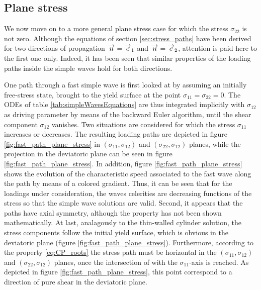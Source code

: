 \subsection{Plane stress}
We now move on to a more general plane stress case for which the stress $\sigma_{22} $ is not zero.
Although the equations of section \ref{sec:stress_paths} have been derived for two directions of propagation ${\overrightarrow{n}}={\overrightarrow{e}}_1$ and ${\overrightarrow{n}}={\overrightarrow{e}}_2 $, attention is paid here to the first one only.
Indeed, it has been seen that similar properties of the loading paths inside the simple waves hold for both directions.

One path through a fast simple wave is first looked at by assuming an initially free-stress state, brought to the yield surface at the point $ \sigma_{11}=\sigma_{22}=0 $.
The ODEs of table \ref{tab:simpleWavesEquations} are thus integrated implicitly with $\sigma_{12}$ as driving parameter by means of the backward Euler algorithm, until the shear component $\sigma_{12}$ vanishes.
Two situations are considered for which the stress $\sigma_{11}$ increases or decreases.
The resulting loading paths are depicted in figure \ref{fig:fast_path_plane_stress} in $(\sigma_{11},\sigma_{12})$ and $(\sigma_{22},\sigma_{12})$ planes, while the projection in the deviatoric plane can be seen in figure \ref{fig:fast_path_plane_stress}.
In addition, figure \ref{fig:fast_path_plane_stress} shows the evolution of the characteristic speed associated to the fast wave along the path by means of a colored gradient.
Thus, it can be seen that for the loadings under consideration, the waves celerities are decreasing functions of the stress so that the simple wave solutions are valid.
Second, it appears that the paths have axial symmetry, although the property has not been shown mathematically.
At last, analagously to the thin-walled cylinder solution, the stress components follow the initial yield surface, which is obvious in the deviatoric plane (figure \ref{fig:fast_path_plane_stress}).
Furthermore, according to the property \eqref{eq:CP_roots} the stress path must be horizontal in the $(\sigma_{11},\sigma_{12})$ and $(\sigma_{22},\sigma_{12})$ planes, once the intersection of with the $\sigma_{11}$-axis is reached.
As depicted in figure \ref{fig:fast_path_plane_stress}, this point correspond to a direction of pure shear in the deviatoric plane.
